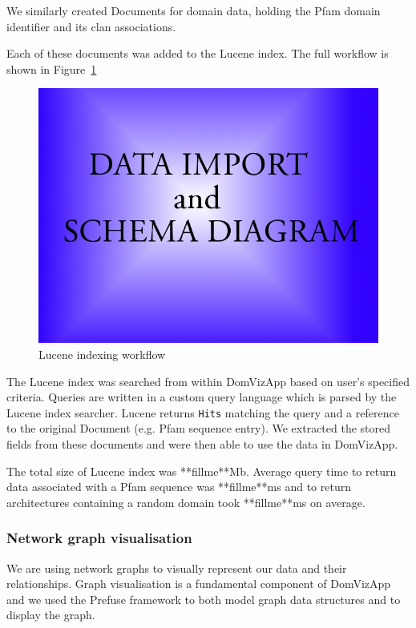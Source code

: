 We similarly created Documents for domain data, holding the Pfam domain identifier and its clan associations. 

Each of these documents was added to the Lucene index. The full workflow is shown in Figure~\ref{luceneworkflow}

\begin{figure}[h]
 \begin{center}
 \includegraphics[scale=0.5]{figures/placeholder.jpg}
 \end{center}
 \caption{Lucene indexing workflow}
 \label{luceneworkflow}
\end{figure}

The Lucene index was searched from within DomVizApp based on user's specified criteria. Queries are written in a custom query language which is parsed by the Lucene index searcher. Lucene returns \texttt{Hits} matching the query and a reference to the original Document (e.g. Pfam sequence entry). We extracted the stored fields from these documents and were then able to use the data in DomVizApp.   

The total size of Lucene index was **fillme**Mb. Average query time to return data associated with a Pfam sequence was **fillme**ms and to return architectures containing a random domain took **fillme**ms on average. 

\subsubsection{Network graph visualisation}
We are using network graphs to visually represent our data and their relationships. Graph visualisation is a fundamental component of DomVizApp and we used the Prefuse framework to both model graph data structures and to display the graph.

